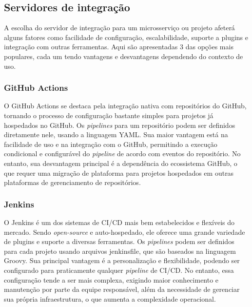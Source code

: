 \subsection{Servidores de integração}
A escolha do servidor de integração para um microsserviço ou projeto afeterá alguns fatores como facilidade de configuração, escalabilidade, suporte a plugins e integração com outras ferramentas. Aqui são apresentadas 3 das opções mais populares, cada um tendo vantagens e desvantagens dependendo do contexto de uso.

\subsubsection*{GitHub Actions}
O GitHub Actions se destaca pela integração nativa com repositórios do GitHub, tornando o processo de configuração bastante simples para projetos já hospedados no GitHub. Os \emph{pipelines} para um repositório podem ser definidos diretamente nele, usando a linguagem YAML. Sua maior vantagem está na facilidade de uso e na integração com o GitHub, permitindo a execução condicional e configurável do \emph{pipeline} de acordo com eventos do repositório. No entanto, sua desvantagem principal é a dependência do ecossistema GitHub, o que requer uma migração de plataforma para projetos hospedados em outras plataformas de gerenciamento de repositórios.

\subsubsection*{Jenkins}
O Jenkins é um dos sistemas de CI/CD mais bem estabelecidos e flexíveis do mercado. Sendo \emph{open-source} e auto-hospedado, ele oferece uma grande variedade de plugins e suporte a diversas ferramentas. Os \emph{pipelines} podem ser definidos para cada projeto usando arquivos jenkinsfile, que são baseados na linguagem Groovy. Sua principal vantagem é a personalização e flexibilidade, podendo ser configurado para praticamente qualquer \emph{pipeline} de CI/CD. No entanto, essa configuração tende a ser mais complexa, exigindo maior conhecimento e manutenção por parte da equipe responsável, além da necessidade de gerenciar sua própria infraestrutura, o que aumenta a complexidade operacional.

